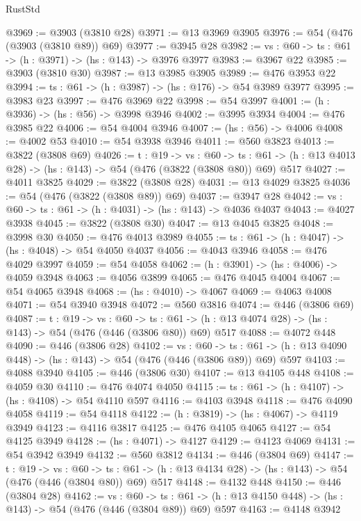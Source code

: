\begin{lexlean}{RustStd}
\begin{coremodule}
@3969 := @3903 (@3810 @28)
@3971 := @13 @3969 @3905
@3976 := @54 (@476 (@3903 (@3810 @89)) @69)
@3977 := @3945 @28
@3982 := {vs : @60} -> {ts : @61} -> (h : @3971) -> (hs : @143) -> @3976 @3977
@3983 := @3967 @22
@3985 := @3903 (@3810 @30)
@3987 := @13 @3985 @3905
@3989 := @476 @3953 @22
@3994 := {ts : @61} -> (h : @3987) -> (hs : @176) -> @54 @3989 @3977
@3995 := @3983 @23
@3997 := @476 @3969 @22
@3998 := @54 @3997
@4001 := (h : @3936) -> (hs : @56) -> @3998 @3946
@4002 := @3995 @3934
@4004 := @476 @3985 @22
@4006 := @54 @4004 @3946
@4007 := (hs : @56) -> @4006
@4008 := @4002 @53
@4010 := @54 @3938 @3946
@4011 := @560 @3823
@4013 := @3822 (@3808 @69)
@4026 := {t : @19} ->
  {vs : @60} ->
  {ts : @61} -> (h : @13 @4013 @28) -> (hs : @143) -> @54 (@476 (@3822 (@3808 @80)) @69) @517
@4027 := @4011 @3825
@4029 := @3822 (@3808 @28)
@4031 := @13 @4029 @3825
@4036 := @54 (@476 (@3822 (@3808 @89)) @69)
@4037 := @3947 @28
@4042 := {vs : @60} -> {ts : @61} -> (h : @4031) -> (hs : @143) -> @4036 @4037
@4043 := @4027 @3938
@4045 := @3822 (@3808 @30)
@4047 := @13 @4045 @3825
@4048 := @3998 @30
@4050 := @476 @4013 @3989
@4055 := {ts : @61} -> (h : @4047) -> (hs : @4048) -> @54 @4050 @4037
@4056 := @4043 @3946
@4058 := @476 @4029 @3997
@4059 := @54 @4058
@4062 := (h : @3901) -> (hs : @4006) -> @4059 @3948
@4063 := @4056 @3899
@4065 := @476 @4045 @4004
@4067 := @54 @4065 @3948
@4068 := (hs : @4010) -> @4067
@4069 := @4063 @4008
@4071 := @54 @3940 @3948
@4072 := @560 @3816
@4074 := @446 (@3806 @69)
@4087 := {t : @19} ->
  {vs : @60} ->
  {ts : @61} -> (h : @13 @4074 @28) -> (hs : @143) -> @54 (@476 (@446 (@3806 @80)) @69) @517
@4088 := @4072 @448
@4090 := @446 (@3806 @28)
@4102 := {vs : @60} ->
  {ts : @61} -> (h : @13 @4090 @448) -> (hs : @143) -> @54 (@476 (@446 (@3806 @89)) @69) @597
@4103 := @4088 @3940
@4105 := @446 (@3806 @30)
@4107 := @13 @4105 @448
@4108 := @4059 @30
@4110 := @476 @4074 @4050
@4115 := {ts : @61} -> (h : @4107) -> (hs : @4108) -> @54 @4110 @597
@4116 := @4103 @3948
@4118 := @476 @4090 @4058
@4119 := @54 @4118
@4122 := (h : @3819) -> (hs : @4067) -> @4119 @3949
@4123 := @4116 @3817
@4125 := @476 @4105 @4065
@4127 := @54 @4125 @3949
@4128 := (hs : @4071) -> @4127
@4129 := @4123 @4069
@4131 := @54 @3942 @3949
@4132 := @560 @3812
@4134 := @446 (@3804 @69)
@4147 := {t : @19} ->
  {vs : @60} ->
  {ts : @61} -> (h : @13 @4134 @28) -> (hs : @143) -> @54 (@476 (@446 (@3804 @80)) @69) @517
@4148 := @4132 @448
@4150 := @446 (@3804 @28)
@4162 := {vs : @60} ->
  {ts : @61} -> (h : @13 @4150 @448) -> (hs : @143) -> @54 (@476 (@446 (@3804 @89)) @69) @597
@4163 := @4148 @3942

\end{coremodule}
\end{lexlean}
